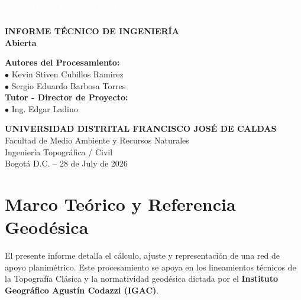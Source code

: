 \documentclass[11pt,letterpaper]{article}
\begin{document}
\begin{titlepage}
\vspace*{-2cm}
\begin{center}
  \textcolor{white}{\Huge \textbf{GEOPORTAL WEB (GeoPol)}} \\[0.5cm]
  \textcolor{white}{\large \textit{''Máxima precisión al alcance de tus manos''}} \\[2cm]
  \vspace{3cm}
  {\LARGE \textbf{INFORME TÉCNICO DE INGENIERÍA}} \\[0.5cm]
  {\Large \textbf{Abierta}} \\[2cm]
  \begin{flushleft}
    \Large \textbf{Autores del Procesamiento:}\\[0.2cm]
    \large $\bullet$ Kevin Stiven Cubillos Ramirez \\[0.1cm]
    \large $\bullet$ Sergio Eduardo Barbosa Torres \\[0.1cm]
    \vspace{1cm}
    \Large \textbf{Tutor - Director de Proyecto:}\\[0.2cm]
    \large $\bullet$ Ing. Edgar Ladino
  \end{flushleft}
  \vfill
  \textbf{UNIVERSIDAD DISTRITAL FRANCISCO JOSÉ DE CALDAS}\\[0.2cm]
  Facultad de Medio Ambiente y Recursos Naturales \\ Ingeniería Topográfica / Civil \\[0.2cm]
  Bogotá D.C. -- 28 de July de 2026
\end{center}
\end{titlepage}
\tableofcontents
\newpage
\section{Marco Teórico y Referencia Geodésica}
El presente informe detalla el cálculo, ajuste y representación de una red de apoyo planimétrico. Este procesamiento se apoya en los lineamientos técnicos de la Topografía Clásica y la normatividad geodésica dictada por el \textbf{Instituto Geográfico Agustín Codazzi (IGAC)}.
\end{document}
